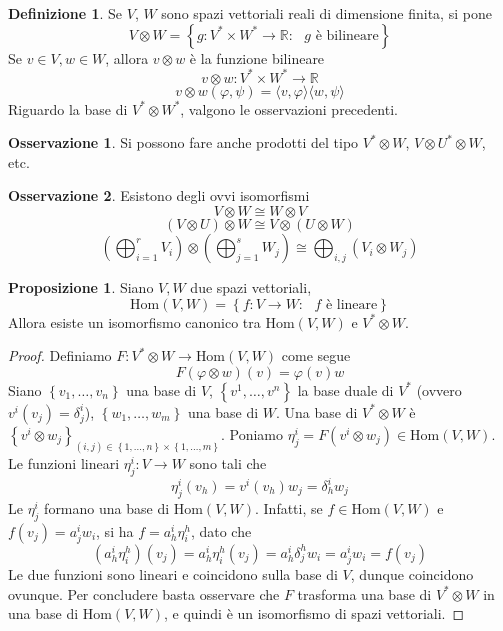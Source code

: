 \documentclass[a4paper,11pt]{article}
\theoremstyle{definition}
\newtheorem{osservazione}{Osservazione}[section]
\newtheorem{definizione}{Definizione}[section]
\theoremstyle{theorem}
\newtheorem{proposizione}{Proposizione}[section]
\begin{document}
\begin{definizione}
	Se $V$, $W$ sono spazi vettoriali reali di dimensione finita, si pone
	\[V\otimes W=\left\{g\colon V^*\times W^*\to\mathbb{R}:\textrm{ $g$ è bilineare}\right\}\]
	Se $v\in V,w\in W$, allora $v\otimes w$ è la funzione bilineare
	\[v\otimes w\colon V^*\times W^*\to\mathbb{R}\]
	\[v\otimes w(\varphi,\psi)=\langle v,\varphi\rangle\langle w,\psi\rangle\]
	Riguardo la base di $V^*\otimes W^*$, valgono le osservazioni precedenti.
\end{definizione}
\begin{osservazione}
	Si possono fare anche prodotti del tipo $V^*\otimes W$, $V\otimes U^*\otimes W$, etc.
\end{osservazione}
\begin{osservazione}
	Esistono degli ovvi isomorfismi
	\[V\otimes W\cong W\otimes V\]
	\[(V\otimes U)\otimes W\cong V\otimes(U\otimes W)\]
	\[\left(\bigoplus_{i=1}^r V_i\right)\otimes\left(\bigoplus_{j=1}^{s}W_j\right)\cong\bigoplus_{i,j}\left(V_i\otimes W_j\right)\]
\end{osservazione}
\begin{proposizione}
	Siano $V,W$ due spazi vettoriali, 
	\[\textrm{Hom}(V,W)=\left\{f\colon V\to W:\textrm{ $f$ è lineare}\right\}\]
	Allora esiste un isomorfismo canonico tra $\textrm{Hom}(V,W)$ e $V^*\otimes W$.
\end{proposizione}
\begin{proof}
	Definiamo $F\colon V^*\otimes W\to\textrm{Hom}(V,W)$ come segue
	\[F\left(\varphi\otimes w\right)(v)=\varphi(v)w\]
	Siano $\left\{v_1,\dots,v_n\right\}$ una base di $V$, $\left\{v^1,\dots,v^n\right\}$ la base duale di $V^*$ (ovvero $v^i(v_j)=\delta^i_j$), $\left\{w_1,\dots,w_m\right\}$ una base di $W$. Una base di $V^*\otimes W$ è $\left\{v^i\otimes w_j\right\}_{(i,j)\in\left\{1,\dots,n\right\}\times\left\{1,\dots,m\right\}}$. Poniamo $\eta^i_j=F\left(v^i\otimes w_j\right)\in\textrm{Hom}(V,W)$. Le funzioni lineari $\eta^i_j\colon V\to W$ sono tali che
	\[\eta^i_j(v_h)=v^i(v_h)w_j=\delta^i_hw_j\]
	Le $\eta^i_j$ formano una base di $\textrm{Hom}(V,W)$. Infatti, se $f\in\textrm{Hom}(V,W)$ e $f(v_j)=a^i_jw_i$, si ha $f=a^i_h\eta^h_i$, dato che
	\[(a^i_h\eta^h_i)(v_j)=a^i_h\eta^h_i(v_j)=a^i_h\delta^h_jw_i=a^i_jw_i=f(v_j)\]
	Le due funzioni sono lineari e coincidono sulla base di $V$, dunque coincidono ovunque.
	Per concludere basta osservare che $F$ trasforma una base di $V^*\otimes W$ in una base di $\textrm{Hom}(V,W)$, e quindi è un isomorfismo di spazi vettoriali.
\end{proof}
\end{document}
